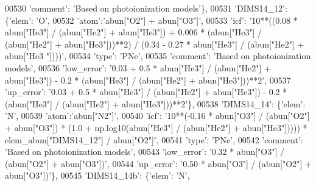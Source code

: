 \begin{DoxyCode}
00530                                        \textcolor{stringliteral}{'comment'}: \textcolor{stringliteral}{'Based on photoionization models'}\},
00531                          \textcolor{stringliteral}{'DIMS14\_12'}: \{\textcolor{stringliteral}{'elem'}: \textcolor{stringliteral}{'O'},
00532                                        \textcolor{stringliteral}{'atom'}:\textcolor{stringliteral}{'abun["O2"] + abun["O3"]'}, 
00533                                        \textcolor{stringliteral}{'icf'}: \textcolor{stringliteral}{'10**((0.08 * abun["He3"] / (abun["He2"] + abun["He3"]) +
       0.006 * (abun["He3"] / (abun["He2"] + abun["He3"]))**2) / (0.34 - 0.27 * abun["He3"] / (abun["He2"] + abun["He3
      "])))'},
00534                                        \textcolor{stringliteral}{'type'}: \textcolor{stringliteral}{'PNe'},
00535                                        \textcolor{stringliteral}{'comment'}: \textcolor{stringliteral}{'Based on photoionization models'},
00536                                        \textcolor{stringliteral}{'low\_error'}: \textcolor{stringliteral}{'0.03 + 0.5 * abun["He3"] / (abun["He2"] + abun["He3"])
       - 0.2 * (abun["He3"] / (abun["He2"] + abun["He3"]))**2'},
00537                                        \textcolor{stringliteral}{'up\_error'}: \textcolor{stringliteral}{'0.03 + 0.5 * abun["He3"] / (abun["He2"] + abun["He3"])
       - 0.2 * (abun["He3"] / (abun["He2"] + abun["He3"]))**2'}\},
00538                          \textcolor{stringliteral}{'DIMS14\_14'}: \{\textcolor{stringliteral}{'elem'}: \textcolor{stringliteral}{'N'},
00539                                        \textcolor{stringliteral}{'atom'}:\textcolor{stringliteral}{'abun["N2"]'}, 
00540                                        \textcolor{stringliteral}{'icf'}: \textcolor{stringliteral}{'10**(-0.16 * abun["O3"] / (abun["O2"] + abun["O3"]) * (1.0 +
       np.log10(abun["He3"] / (abun["He2"] + abun["He3"])))) * elem\_abun["DIMS14\_12"] / abun["O2"]'},
00541                                        \textcolor{stringliteral}{'type'}: \textcolor{stringliteral}{'PNe'},
00542                                        \textcolor{stringliteral}{'comment'}: \textcolor{stringliteral}{'Based on photoionization models'},
00543                                        \textcolor{stringliteral}{'low\_error'}: \textcolor{stringliteral}{'0.32 * abun["O3"] / (abun["O2"] + abun["O3"])'},
00544                                        \textcolor{stringliteral}{'up\_error'}: \textcolor{stringliteral}{'0.50 * abun["O3"] / (abun["O2"] + abun["O3"])'}\},
00545                          \textcolor{stringliteral}{'DIMS14\_14b'}: \{\textcolor{stringliteral}{'elem'}: \textcolor{stringliteral}{'N'},

\end{DoxyCode}
